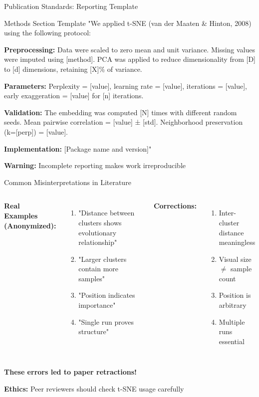 \documentclass[aspectratio=169]{beamer}
\newcommand{\warning}[1]{\colorbox{red!10}{\textcolor{warningcolor}{\textbf{Warning:} #1}}}
\newcommand{\ethics}[1]{\colorbox{purple!10}{\textcolor{ethicscolor}{\textbf{Ethics:} #1}}}
\begin{document}
\begin{frame}{Publication Standards: Reporting Template}
\begin{block}{Methods Section Template}
"We applied t-SNE (van der Maaten \& Hinton, 2008) using the following protocol:

\textbf{Preprocessing:} Data were scaled to zero mean and unit variance. Missing values were imputed using [method]. PCA was applied to reduce dimensionality from [D] to [d] dimensions, retaining [X]\% of variance.

\textbf{Parameters:} Perplexity = [value], learning rate = [value], iterations = [value], early exaggeration = [value] for [n] iterations.

\textbf{Validation:} The embedding was computed [N] times with different random seeds. Mean pairwise correlation = [value] ± [std]. Neighborhood preservation (k=[perp]) = [value].

\textbf{Implementation:} [Package name and version]"
\end{block}

\warning{Incomplete reporting makes work irreproducible}
\end{frame}

\begin{frame}{Common Misinterpretations in Literature}
\begin{columns}
\textbf{Real Examples (Anonymized):}
\begin{enumerate}
\item "Distance between clusters shows evolutionary relationship"
\item "Larger clusters contain more samples"
\item "Position indicates importance"
\item "Single run proves structure"
\end{enumerate}

\textbf{Corrections:}
\begin{enumerate}
\item Inter-cluster distance meaningless
\item Visual size $\neq$ sample count
\item Position is arbitrary
\item Multiple runs essential
\end{enumerate}
\end{columns}

\vspace{0.3cm}
\colorbox{red!30}{\parbox{0.9\textwidth}{\centering\textbf{These errors led to paper retractions!}}}

\vspace{0.2cm}
\ethics{Peer reviewers should check t-SNE usage carefully}
\end{frame}
\end{document}
